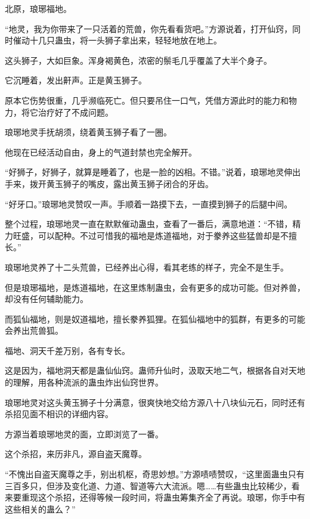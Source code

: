
\begin{this_body}



北原，琅琊福地。

“地灵，我为你带来了一只活着的荒兽，你先看看货吧。”方源说着，打开仙窍，同时催动十几只蛊虫，将一头狮子拿出来，轻轻地放在地上。

这头狮子，大如巨象。浑身褐黄色，浓密的鬃毛几乎覆盖了大半个身子。

它沉睡着，发出鼾声。正是黄玉狮子。

原本它伤势很重，几乎濒临死亡。但只要吊住一口气，凭借方源此时的能力和物力，将它治疗好了不成问题。

琅琊地灵手抚胡须，绕着黄玉狮子看了一圈。

他现在已经活动自由，身上的气道封禁也完全解开。

“好狮子，好狮子，就算是睡着了，也是一脸的凶相。不错。”说着，琅琊地灵伸出手来，拨开黄玉狮子的嘴皮，露出黄玉狮子闭合的牙齿。

“好牙口。”琅琊地灵赞叹一声。手顺着一路摸下去，一直摸到狮子的后腿中间。

整个过程，琅琊地灵一直在默默催动蛊虫，查看了一番后，满意地道：“不错，精力旺盛，可以配种。不过可惜我的福地是炼道福地，对于豢养这些猛兽却是不擅长。”

琅琊地灵养了十二头荒兽，已经养出心得，看其老练的样子，完全不是生手。

但是琅琊福地，是炼道福地，在这里炼制蛊虫，会有更多的成功可能。但对养兽，却没有任何辅助能力。

而狐仙福地，则是奴道福地，擅长豢养狐狸。在狐仙福地中的狐群，有更多的可能会养出荒兽狐。

福地、洞天千差万别，各有专长。

这是因为，福地洞天都是蛊仙仙窍。蛊师升仙时，汲取天地二气，根据各自对天地的理解，用各种流派的蛊虫炸出仙窍世界。

琅琊地灵对这头黄玉狮子十分满意，很爽快地交给方源八十八块仙元石，同时还有杀招见面不相识的详细内容。

方源当着琅琊地灵的面，立即浏览了一番。

这个杀招，来历非凡，源自盗天魔尊。

“不愧出自盗天魔尊之手，别出机枢，奇思妙想。”方源啧啧赞叹，“这里面蛊虫只有三百多只，但涉及变化道、力道、智道等六大流派。嗯……有些蛊虫比较稀少，看来要重现这个杀招，还得等候一段时间，将蛊虫筹集齐全了再说。琅琊，你手中有这些相关的蛊么？”


\end{this_body}
